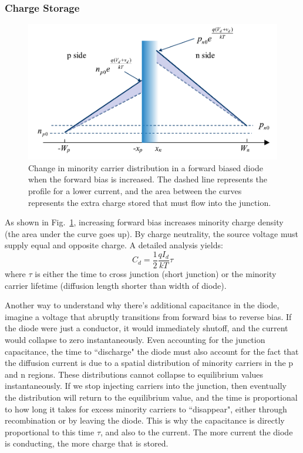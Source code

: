 \subsubsection*{Charge Storage} \label{sec:charge_storage}
\begin{figure}[tb]
\begin{center}
\includegraphics[width=.75\columnwidth]{slide47}
\end{center}
\caption{Change in minority carrier distribution in a forward biased diode when the forward bias is increased.  The dashed line represents the profile for a lower current, and the area between the curves represents the extra charge stored that must flow into the junction.}
\label{fig:slide47}
\end{figure}

As shown in Fig.~\ref{fig:slide47}, increasing forward bias increases minority charge density (the area under the curve goes up).   By charge neutrality, the source voltage must supply equal and opposite charge.   A detailed analysis yields:
\begin{equation}{C_d} = \frac{1}{2}\frac{{q{I_d}}}{{kT}}\tau \end{equation}
where  $\tau$ is either the time to cross junction (short junction) or the minority carrier lifetime (diffusion length shorter than width of diode).  
 
Another way to understand why there's additional capacitance in the diode, imagine a voltage that abruptly transitions from forward bias to reverse bias.  If the diode were just a conductor, it would immediately shutoff, and the current would collapse to zero instantaneously.  Even accounting for the junction capacitance, the time to ``discharge" the diode must also account for the fact that the diffusion current is due to a spatial distribution of minority carriers in the p and n regions.  These distributions cannot collapse to equilibrium values instantaneously.  If we stop injecting carriers into the junction, then eventually the distribution will return to the equilibrium value, and the time is proportional to how long it takes for excess minority carriers to ``disappear", either through recombination or by leaving the diode.  This is why the capacitance is directly proportional to this time $\tau$, and also to the current.  The more current the diode is conducting, the more charge that is stored.  
